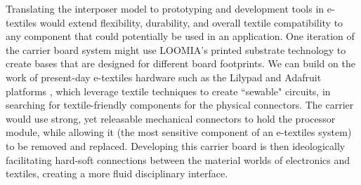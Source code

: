 Translating the interposer model to prototyping and development tools in e-textiles would extend flexibility, durability, and overall textile compatibility to any component that could potentially be used in an application. One iteration of the carrier board system might use LOOMIA's printed substrate technology to create bases that are designed for different board footprints. We can build on the work of present-day e-textiles hardware such as the Lilypad and Adafruit platforms \cite{buechley_lilypad_2008, posch_etextiles_2019, jones_wearable_2020}, which leverage textile techniques to create ``sewable" circuits, in searching for textile-friendly components for the physical connectors. The carrier would use strong, yet releasable mechanical connectors to hold the processor module, while allowing it (the most sensitive component of an e-textiles system) to be removed and replaced. 
Developing this carrier board is then ideologically facilitating hard-soft connections between the material worlds of electronics and textiles, creating a more fluid disciplinary interface.



